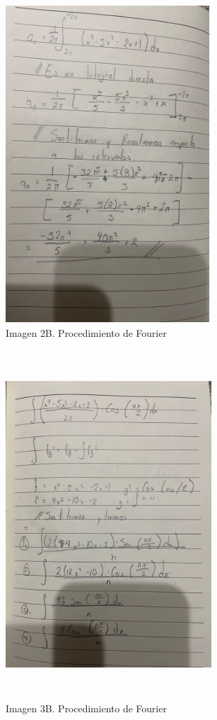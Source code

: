 \begin{figure}[H]
	\centering
	\includegraphics[width=3.03622in,height=4.74409in]{media/image8.jpg}
	\caption{Imagen 2B. Procedimiento de Fourier}
\end{figure}

\begin{figure}[H]
	\centering
	\includegraphics[width=3.0625in,height=5.18146in]{media/image42.jpg}
	\caption{Imagen 3B. Procedimiento de Fourier}
\end{figure}


